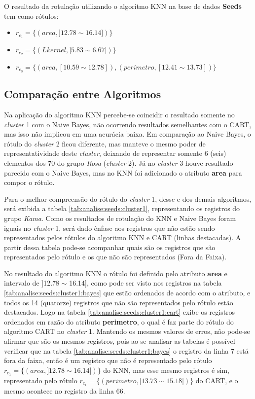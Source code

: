 O resultado da rotulação utilizando o algoritmo KNN na base de dados \textbf{Seeds} tem como rótulos: 
\begin{itemize}[noitemsep]
 \item ${r_{c_1}=\{ (area, ]12.78 \sim 16.14]) \} }$
 \item ${r_{c_2}=\{ (Lkernel, ]5.83 \sim 6.67]) \} }$
 \item ${r_{c_3}=\{ (area, [10.59 \sim 12.78]), (perimetro, [12.41 \sim 13.73]) \} }$
 
\end{itemize}


\subsection{Comparação entre Algoritmos} \label{cap:resultados:ssec:compalgoritmos}

Na aplicação do algoritmo KNN percebe-se coincidir o resultado somente no \textit{cluster} 1 com o Naive Bayes, não ocorrendo resultados semelhantes com o CART, mas isso não implicou em uma acurácia baixa. Em comparação ao Naive Bayes, o rótulo do \textit{cluster} 2 ficou diferente, mas manteve o mesmo poder de representatividade deste \textit{cluster}, deixando de representar somente 6 (seis) elementos dos 70 do grupo \textit{Rosa} (\textit{cluster} 2). Já no \textit{cluster} 3 houve resultado parecido com o Naive Bayes, mas no KNN foi adicionado o  atributo \textbf{area} para compor o rótulo.


Para o melhor compreensão do rótulo do \textit{cluster} 1, desse e dos demais  algoritmos, será exibida a tabela \ref{tab:analise:seeds:cluster1}, representando os registros do grupo \textit{Kama}. Como os resultados de rotulação do KNN e Naive Bayes foram iguais no \textit{cluster} 1, será dado ênfase aos registros que não estão sendo representados pelos rótulos do algoritmo KNN e CART (linhas destacadas). A partir dessa tabela pode-se acompanhar quais são os registros que são representados pelo rótulo e os que não são representados (Fora da Faixa). 

No resultado do algoritmo KNN o rótulo foi definido pelo atributo \textbf{area} e intervalo de ]12.78 $\sim$ 16.14], como pode ser visto nos registros na tabela \ref{tab:analise:seeds:cluster1:bayes} que estão ordenados de acordo com o atributo, e todos os 14 (quatorze) registros que não são representados pelo rótulo estão destacados. Logo na tabela \ref{tab:analise:seeds:cluster1:cart} exibe os registros ordenados em razão do atributo \textbf{perimetro}, o qual é faz parte do rótulo do algoritmo CART no \textit{cluster} 1. Mantendo os mesmos valores de erros, não pode-se afirmar que são os mesmos registros, pois ao se analisar as tabelas é possível verificar que na tabela \ref{tab:analise:seeds:cluster1:bayes} o registro da linha 7 está fora da faixa, então é um registro que não é representado pelo rótulo ${r_{c_1}=\{ (area, ]12.78 \sim 16.14]) \} }$ do KNN, mas esse mesmo registros é sim, representado pelo rótulo ${r_{c_1}=\{ (perimetro, ]13.73 \sim 15.18]) \} }$ do CART, e o mesmo acontece no registro da linha 66. 

